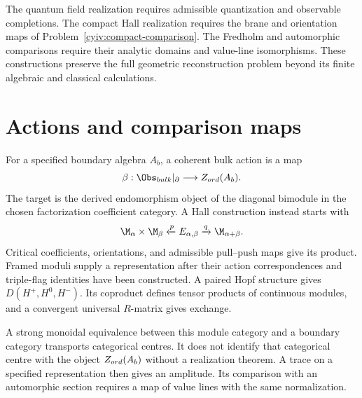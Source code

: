 The quantum field realization requires admissible quantization and
observable completions.
The compact Hall realization requires the brane and orientation maps
of Problem~\ref{cyiv:compact-comparison}.
The Fredholm and automorphic comparisons require their analytic domains
and value-line isomorphisms.
These constructions preserve the full geometric reconstruction problem
beyond its finite algebraic and classical calculations.

\chapter{Actions and comparison maps}
For a specified boundary algebra $A_b$, a coherent bulk action is a map
\[
 \beta:\Obs_{\mathrm{bulk}}|_\partial\longrightarrow Z_{\ord}(A_b).
\]
The target is the derived endomorphism object of the diagonal bimodule
in the chosen factorization coefficient category.
A Hall construction instead starts with
\[
 \M_\alpha\times\M_\beta\xleftarrow{p}\mathcal E_{\alpha,\beta}
 \xrightarrow{q}\M_{\alpha+\beta}.
\]
Critical coefficients, orientations, and admissible pull--push maps
give its product.
Framed moduli supply a representation after their action
correspondences and triple-flag identities have been constructed.
A paired Hopf structure gives $D(H^+,H^0,H^-)$.
Its coproduct defines tensor products of continuous modules, and a
convergent universal $R$-matrix gives exchange.

A strong monoidal equivalence between this module category and a
boundary category transports categorical centres.
It does not identify that categorical centre with the object
$Z_{ord}(A_b)$ without a realization theorem.
A trace on a specified representation then gives an amplitude.
Its comparison with an automorphic section requires a map of value
lines with the same normalization.

